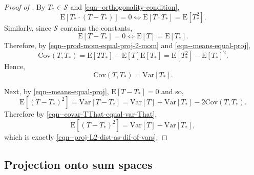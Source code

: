 \documentclass[12pt]{article}
\numberwithin{equation}{section}
\theoremstyle{definition}
\theoremstyle{plain}
\begin{document}
\begin{proof}[Proof of ]
By \(T_{\ast} \in \mathcal{S}\) and \eqref{eqn--orthogonality-condition},
\begin{equation}
  \mathrm{E} \left[ T_{\ast} \cdot \left( T - T_{\ast} \right) \right] = 0
   \iff \mathrm{E} \left[ T \cdot T_{\ast} \right] = \mathrm{E} \left[
   T_{\ast}^{2} \right].
  \label{eqn--prod-mom-equal-proj-2-mom}
\end{equation}
Similarly, since \(\mathcal{S}\) contains the constants,
\begin{equation}
  \mathrm{E} \left[ T - T_{\ast} \right] = 0 \iff \mathrm{E} [T] =
  \mathrm{E} \left[ T_{\ast} \right].
  \label{eqn--means-equal-proj}
\end{equation}
Therefore, by \eqref{eqn--prod-mom-equal-proj-2-mom} and
\eqref{eqn--means-equal-proj},
\begin{equation*}
  \mathrm{Cov} \left( T, T_{\ast} \right) = \mathrm{E} \left[ T T_{\ast}
  \right] - \mathrm{E} [T] \mathrm{E} \left[ T_{\ast} \right] = \mathrm{E}
  \left[ T_{\ast}^{2} \right] - \mathrm{E} \left[ T_{\ast} \right]^{2}.
\end{equation*}
Hence,
\begin{equation}
  \mathrm{Cov} \left( T, T_{\ast} \right) = \mathrm{Var} \left[ T_{\ast}
  \right].
  \label{eqn--covar-TThat-equal-var-That}
\end{equation}

Next, by \eqref{eqn--means-equal-proj}, \(\mathrm{E} \left[ T - T_{\ast} \right]
= 0\) and so,
\begin{equation*}
  \mathrm{E} \left[ \left( T - T_{\ast} \right)^{2} \right] = \mathrm{Var}
  \left[ T - T_{\ast} \right] = \mathrm{Var} [T] + \mathrm{Var} \left[
  T_{\ast} \right] - 2 \mathrm{Cov} \left( T, T_{\ast} \right).
\end{equation*}
Therefore by \eqref{eqn--covar-TThat-equal-var-That},
\begin{equation}
  \mathrm{E} \left[ \left( T - T_{\ast} \right)^{2} \right] = \mathrm{Var}
  [T] - \mathrm{Var} \left[ T_{\ast} \right],
\end{equation}
which is exactly \eqref{eqn--proj-L2-dist-as-dif-of-vars}.
\end{proof}

\subsection{Projection onto sum spaces}
\end{document}
